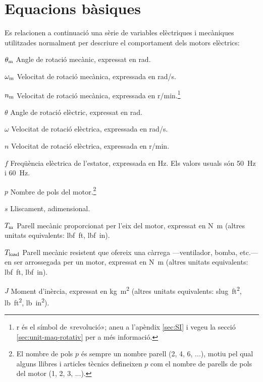 \section{Equacions bàsiques}

Es relacionen a continuació una sèrie de variables elèctriques i mecàniques utilitzades normalment per descriure el comportament dels motors elèctrics:

\begin{list}{}
   {\setlength{\labelwidth}{15mm} \setlength{\leftmargin}{20mm} \setlength{\labelsep}{5mm}}
   \item[$\theta_\mathrm{m}$] Angle de rotació mecànic, expressat en \unit{rad}.
   \item[$\omega_\mathrm{m}$] Velocitat de rotació mecànica, expressada en \unit{rad/s}.
   \item[$n_\mathrm{m}$] Velocitat de rotació mecànica, expressada en \unit{r/min}.\footnote{r és el símbol de «revolució»; aneu a l'apèndix \ref{sec:SI} i vegeu la secció \ref{sec:unit-maq-rotativ} per a més informació.}
   \item[$\theta$] Angle de rotació elèctric, expressat en \unit{rad}.
   \item[$\omega$] Velocitat de rotació elèctrica, expressada en \unit{rad/s}.
   \item[$n$] Velocitat de rotació elèctrica, expressada en \unit{r/min}.
   \item[$f$] Freqüència elèctrica de l'estator, expressada en \unit{Hz}. Els valors usuals són \qty{50}{Hz} i \qty{60}{Hz}.
   \item[$p$] Nombre de pols del motor.\footnote{El nombre de pols $p$  és sempre un nombre parell (2, 4, 6, ...), motiu pel qual alguns llibres i articles tècnics  defineixen $p$ com el nombre de parells de pols del motor       (1, 2, 3, ...).}
   \item[$s$] Lliscament, adimensional.
   \item[$T_\mathrm{m}$] Parell mecànic proporcionat per l'eix del motor, expressat en \unit{N.m} (altres unitats equivalents: \unit{lbf.ft}, \unit{lbf.in}).
   \item[$T_\mathrm{load}$] Parell mecànic resistent que ofereix una càrrega ---ventilador, bomba, etc.--- en ser arrossegada per un motor, expressat en \unit{N.m} (altres unitats equivalents: \unit{lbf.ft}, \unit{lbf.in}).
   \item[$J$] Moment d'inèrcia, expressat en \unit{kg.m^2} (altres unitats equivalents: \unit{slug.ft^2}, \unit{lb.ft^2}, \unit{lb.in^2}).

\end{list}
